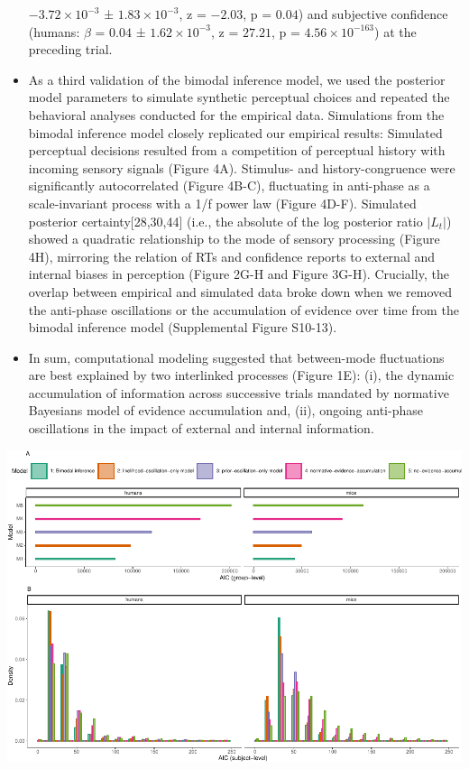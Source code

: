 \documentclass[
]{article}
\begin{document}
\begin{itemize}
  \(\ensuremath{-3.72\times 10^{-3}}\) ±
  \(\ensuremath{1.83\times 10^{-3}}\), z = \(-2.03\), p = \(0.04\)) and
  subjective confidence (humans: \(\beta\) = \(0.04\) ±
  \(\ensuremath{1.62\times 10^{-3}}\), z = \(27.21\), p =
  \(\ensuremath{4.56\times 10^{-163}}\)) at the preceding trial.
\item
  As a third validation of the bimodal inference model, we used the
  posterior model parameters to simulate synthetic perceptual choices
  and repeated the behavioral analyses conducted for the empirical data.
  Simulations from the bimodal inference model closely replicated our
  empirical results: Simulated perceptual decisions resulted from a
  competition of perceptual history with incoming sensory signals
  (Figure 4A). Stimulus- and history-congruence were significantly
  autocorrelated (Figure 4B-C), fluctuating in anti-phase as a
  scale-invariant process with a 1/f power law (Figure 4D-F). Simulated
  posterior certainty{[}28,30,44{]} (i.e., the absolute of the log
  posterior ratio \(|L_t|\)) showed a quadratic relationship to the mode
  of sensory processing (Figure 4H), mirroring the relation of RTs and
  confidence reports to external and internal biases in perception
  (Figure 2G-H and Figure 3G-H). Crucially, the overlap between
  empirical and simulated data broke down when we removed the anti-phase
  oscillations or the accumulation of evidence over time from the
  bimodal inference model (Supplemental Figure S10-13).
\item
  In sum, computational modeling suggested that between-mode
  fluctuations are best explained by two interlinked processes (Figure
  1E): (i), the dynamic accumulation of information across successive
  trials mandated by normative Bayesians model of evidence accumulation
  and, (ii), ongoing anti-phase oscillations in the impact of external
  and internal information.
\end{itemize}

\includegraphics{modes_mouse_rev2_files/figure-latex/Supplemental_Figure_S9_print-1.pdf}
\end{document}
